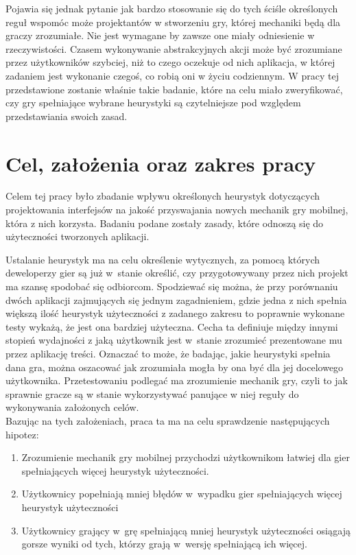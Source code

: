 \documentclass[a4paper,12pt,numbers=noenddot]{report}
\begin{document}
Pojawia się jednak pytanie jak bardzo stosowanie się do tych ściśle określonych reguł wspomóc może projektantów w stworzeniu gry, której mechaniki będą dla graczy zrozumiałe. Nie jest wymagane by zawsze one miały odniesienie w rzeczywistości. Czasem wykonywanie abstrakcyjnych akcji może być zrozumiane przez użytkowników szybciej, niż to czego oczekuje od nich aplikacja, w której zadaniem jest wykonanie czegoś, co robią oni w życiu codziennym. W pracy tej przedstawione zostanie właśnie takie badanie, które na celu miało zweryfikować, czy gry spełniające wybrane heurystyki są czytelniejsze pod względem przedstawiania swoich zasad. 

\chapter{Cel, założenia oraz zakres pracy}
Celem tej pracy było zbadanie wpływu określonych heurystyk dotyczących projektowania interfejsów na jakość przyswajania nowych mechanik gry mobilnej, która z nich korzysta. Badaniu podane zostały zasady, które odnoszą się do użyteczności tworzonych aplikacji.

Ustalanie heurystyk ma na celu określenie wytycznych, za pomocą których deweloperzy gier są już w~stanie określić, czy przygotowywany przez nich projekt ma szansę spodobać się odbiorcom. Spodziewać się można, że przy porównaniu dwóch aplikacji zajmujących się jednym zagadnieniem, gdzie jedna z nich spełnia większą ilość heurystyk użyteczności z zadanego zakresu to poprawnie wykonane testy wykażą, że jest ona bardziej użyteczna. Cecha ta definiuje między innymi stopień wydajności z jaką użytkownik jest w~stanie zrozumieć prezentowane mu przez aplikację treści. Oznaczać to może, że badając, jakie heurystyki spełnia dana gra, można oszacować jak zrozumiała mogła by ona być dla jej docelowego użytkownika. Przetestowaniu podlegać ma zrozumienie mechanik gry, czyli to jak sprawnie gracze są w stanie wykorzystywać panujące w niej reguły do wykonywania założonych celów.\\
Bazując na tych założeniach, praca ta ma na celu sprawdzenie następujących hipotez:

\begin{enumerate}
\item Zrozumienie mechanik gry mobilnej przychodzi użytkownikom łatwiej dla gier spełniających więcej heurystyk użyteczności.
\item Użytkownicy popełniają mniej błędów w~wypadku gier spełniających więcej heurystyk użyteczności
\item Użytkownicy grający w~grę spełniającą mniej heurystyk użyteczności osiągają gorsze wyniki od tych, którzy grają w~wersję spełniającą ich więcej.
\end{enumerate}
\end{document}
